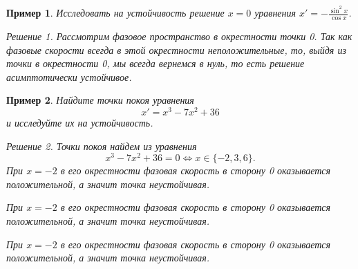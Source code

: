\documentclass[a5paper, 11pt]{article}
\theoremstyle{definition}
\theoremstyle{plain}
\newtheorem{Ex}{Пример}
\theoremstyle{remark}
\newtheorem*{Solution}{Решение}
\begin{document}
	\begin{Ex}
		Исследовать на устойчивость решение $x=0$ уравнения $x' = -\frac{\sin^2 x}{\cos x}$.
		\begin{Solution}
			Рассмотрим фазовое пространство в окрестности точки 0. Так как фазовые скорости всегда в этой окрестности неположительные, то, выйдя из точки в окрестности 0, мы всегда вернемся в нуль, то есть решение асимптотически устойчивое.
		\end{Solution}
	\end{Ex}
	\begin{Ex}
		Найдите точки покоя уравнения
		\[
		x'=x^3-7x^2+36
		\]
		и исследуйте их на устойчивость.
		\begin{Solution}
			Точки покоя найдем из уравнения 
			\[
			x^3 - 7x^2 + 36 = 0 \Leftrightarrow x\in \{-2,3,6\}.
			\]
			При $x=-2$ в его окрестности фазовая скорость в сторону 0 оказывается положительной, а значит точка неустойчивая.
			
			При $x=-2$ в его окрестности фазовая скорость в сторону 0 оказывается положительной, а значит точка неустойчивая.
			
			При $x=-2$ в его окрестности фазовая скорость в сторону 0 оказывается положительной, а значит точка неустойчивая.
			
			
		\end{Solution}
	\end{Ex}
\end{document}
